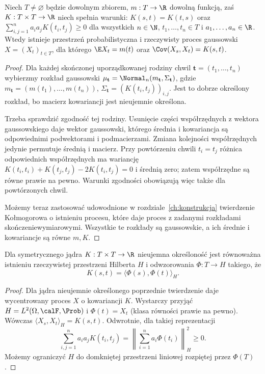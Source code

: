 \begin{twierdzenie}
Niech $T\ne\varnothing$ będzie dowolnym zbiorem,
$m:T\to\R$ dowolną funkcją, zaś $K:T\times T\to\R$
niech spełnia warunki: $K(s,t)=K(t,s)$ oraz
$\sum_{i,j=1}^n a_i a_jK(t_i,t_j)\ge0$ dla wszystkich
$n\in\N$, $t_1,\ldots,t_n\in T$ i $a_1,\ldots,a_n\in\R$.
Wtedy istnieje przestrzeń probabilistyczna i rzeczywisty proces
gaussowski $X=(X_t)_{t\in T}$, dla którego
$\E X_t=m(t)$ oraz $\Cov(X_s,X_t)=K(s,t)$.
\end{twierdzenie}
\begin{proof}
Dla każdej skończonej uporządkowanej rodziny chwil
$\mathbf t=(t_1,\ldots,t_n)$ wybierzmy rozkład gaussowski
$\mu_{\mathbf t}=\Normal_n(m_{\mathbf t},\Sigma_{\mathbf t})$,
gdzie $m_{\mathbf t}=(m(t_1),\ldots,m(t_n))$,
$\Sigma_{\mathbf t}=(K(t_i,t_j))_{i,j}$. Jest to dobrze określony
rozkład, bo macierz kowariancji jest nieujemnie określona.

Trzeba sprawdzić zgodność tej rodziny. Usunięcie części współrzędnych
z wektora gaussowskiego daje wektor gaussowski, którego średnia i
kowariancja są odpowiednimi podwektorami i podmacierzami.
Zmiana kolejności współrzędnych jedynie permutuje średnią i macierz.
Przy powtórzeniu chwili $t_i=t_j$ różnica odpowiednich współrzędnych
ma wariancję $K(t_i,t_i)+K(t_j,t_j)-2K(t_i,t_j)=0$ i średnią zero;
zatem współrzędne są równe prawie na pewno.
Warunki zgodności obowiązują więc także dla powtórzonych chwil.

Możemy teraz zastosować udowodnione w rozdziale~\ref{ch:konstrukcja}
twierdzenie Kołmogorowa o istnieniu procesu, które daje proces
z zadanymi rozkładami skończeniewymiarowymi. Wszystkie te rozkłady
są gaussowskie, a ich średnie i kowariancje są równe $m,K$.
\end{proof}

\begin{stwierdzenie}
Dla symetrycznego jądra $K:T\times T\to\R$ nieujemna
określoność jest równoważna istnieniu rzeczywistej
przestrzeni Hilberta $H$ i odwzorowania $\Phi:T\to H$
takiego, że
\[
K(s,t)=\langle\Phi(s),\Phi(t)\rangle_H.
\]
\end{stwierdzenie}
\begin{proof}
Dla jądra nieujemnie określonego poprzednie twierdzenie
daje wycentrowany proces $X$ o kowariancji $K$.
Wystarczy przyjąć $H=L^2(\Omega,\calF,\Prob)$
i $\Phi(t)=X_t$ (klasa równości prawie na pewno).
Wówczas $\langle X_s,X_t\rangle_H=K(s,t)$.
Odwrotnie, dla takiej reprezentacji
\[
\sum_{i,j=1}^n a_ia_jK(t_i,t_j)
=\left\|\sum_{i=1}^n a_i\Phi(t_i)\right\|_H^2\ge0.
\]
Możemy ograniczyć $H$ do domkniętej przestrzeni
liniowej rozpiętej przez $\Phi(T)$.
\end{proof}

